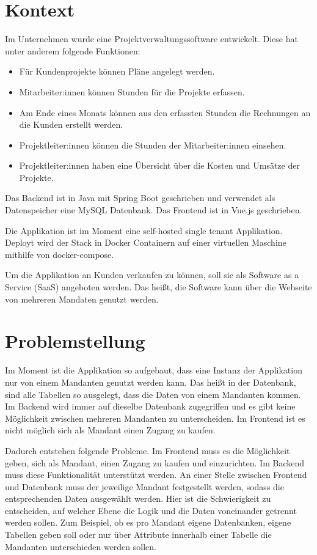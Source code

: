 \section{Kontext}\label{sec:kontext}

Im Unternehmen wurde eine Projektverwaltungssoftware entwickelt.
Diese hat unter anderem folgende Funktionen:
\begin{itemize}
  \item Für Kundenprojekte können Pläne angelegt werden.
  \item Mitarbeiter:innen können Stunden für die Projekte erfassen.
  \item Am Ende eines Monats können aus den erfassten Stunden die Rechnungen an die Kunden erstellt werden.
  \item Projektleiter:innen können die Stunden der Mitarbeiter:innen einsehen.
  \item Projektleiter:innen haben eine Übersicht über die Kosten und Umsätze der Projekte.
\end{itemize}

Das Backend ist in Java mit Spring Boot geschrieben und verwendet als
Datenspeicher eine MySQL Datenbank.
Das Frontend ist in Vue.js geschrieben.

Die Applikation ist im Moment eine self-hosted single tenant Applikation.
Deployt wird der Stack in Docker Containern auf einer virtuellen Maschine mithilfe von docker-compose.

Um die Applikation an Kunden verkaufen zu können, soll sie als Software
as a Service (SaaS) angeboten werden.
Das heißt, die Software kann über die Webseite von mehreren Mandaten genutzt werden.


\section{Problemstellung}\label{sec:problemstellung}

Im Moment ist die Applikation so aufgebaut, dass eine Instanz der Applikation nur von einem Mandanten genutzt werden kann.
Das heißt in der Datenbank, sind alle Tabellen so ausgelegt, dass die Daten von einem Mandanten kommen.
Im Backend wird immer auf dieselbe Datenbank zugegriffen und es gibt keine Möglichkeit zwischen mehreren Mandanten zu unterscheiden.
Im Frontend ist es nicht möglich sich als Mandant einen Zugang zu kaufen.

Dadurch entstehen folgende Probleme.
Im Frontend muss es die Möglichkeit geben, sich als Mandant, einen Zugang zu kaufen und einzurichten.
Im Backend muss diese Funktionalität unterstützt werden.
An einer Stelle zwischen Frontend und Datenbank muss der jeweilige Mandant festgestellt werden, sodass die entsprechenden Daten ausgewählt werden.
Hier ist die Schwierigkeit zu entscheiden, auf welcher Ebene die Logik und die Daten voneinander getrennt werden sollen.
Zum Beispiel, ob es pro Mandant eigene Datenbanken, eigene Tabellen geben soll oder nur über Attribute innerhalb einer Tabelle die Mandanten unterschieden werden sollen.

